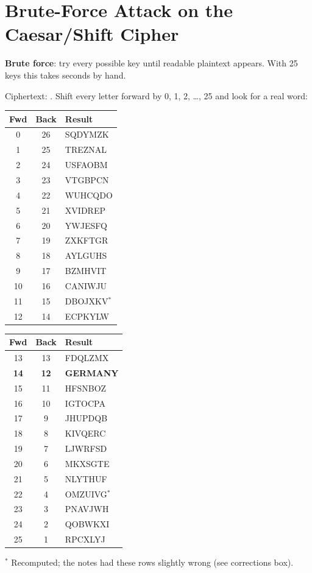 \section{Brute-Force Attack on the Caesar/Shift Cipher}

\begin{keybox}
\textbf{Brute force}: try every possible key until readable plaintext appears. With 25 keys this takes seconds by hand.
\end{keybox}

Ciphertext: . Shift every letter forward by 0, 1, 2, \dots, 25 and look for a real word:

\begin{center}\small\ttfamily\setlength{\tabcolsep}{6pt}
\begin{tabular}{@{}ccl@{}}
\toprule
\rmfamily\bfseries Fwd & \rmfamily\bfseries Back & \rmfamily\bfseries Result\\
\midrule
0 & 26 & SQDYMZK\\
1 & 25 & TREZNAL\\
2 & 24 & USFAOBM\\
3 & 23 & VTGBPCN\\
4 & 22 & WUHCQDO\\
5 & 21 & XVIDREP\\
6 & 20 & YWJESFQ\\
7 & 19 & ZXKFTGR\\
8 & 18 & AYLGUHS\\
9 & 17 & BZMHVIT\\
10 & 16 & CANIWJU\\
11 & 15 & DBOJXKV$^\ast$\\
12 & 14 & ECPKYLW\\
\bottomrule
\end{tabular}
\qquad
\begin{tabular}{@{}ccl@{}}
\toprule
\rmfamily\bfseries Fwd & \rmfamily\bfseries Back & \rmfamily\bfseries Result\\
\midrule
13 & 13 & FDQLZMX\\
\rowcolor{warn!18} \textbf{14} & \textbf{12} & \textbf{GERMANY}\\
15 & 11 & HFSNBOZ\\
16 & 10 & IGTOCPA\\
17 & 9 & JHUPDQB\\
18 & 8 & KIVQERC\\
19 & 7 & LJWRFSD\\
20 & 6 & MKXSGTE\\
21 & 5 & NLYTHUF\\
22 & 4 & OMZUIVG$^\ast$\\
23 & 3 & PNAVJWH\\
24 & 2 & QOBWKXI\\
25 & 1 & RPCXLYJ\\
\bottomrule
\end{tabular}
\end{center}
{\footnotesize $^\ast$ Recomputed; the notes had these rows slightly wrong (see corrections box).}

